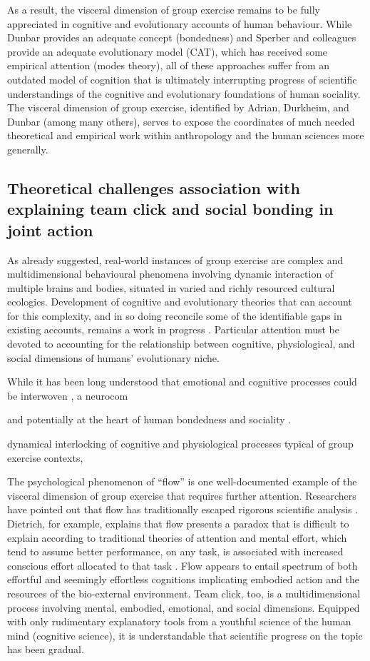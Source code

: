 \begin{CJK}{UTF8}{gbsn}
As a result, the visceral dimension of group exercise remains to be fully appreciated in cognitive and evolutionary accounts of human behaviour.  While Dunbar provides an adequate concept (bondedness) and Sperber and colleagues provide an adequate evolutionary model (CAT), which has received some empirical attention (modes theory), all of these approaches suffer from an outdated model of cognition that is ultimately interrupting progress of scientific understandings of the cognitive and evolutionary foundations of human sociality.  The visceral dimension of group exercise, identified by Adrian, Durkheim, and Dunbar (among many others), serves to expose the coordinates of much needed theoretical and empirical work within anthropology and the human sciences more generally.


\subsection{Theoretical challenges association with explaining team click and social bonding in joint action}

As already suggested, real-world instances of group exercise are complex and multidimensional behavioural phenomena involving dynamic interaction of multiple brains and bodies, situated in varied and richly resourced cultural ecologies.  Development of cognitive and evolutionary theories that can account for this complexity, and in so doing reconcile some of the identifiable gaps in existing accounts, remains a work in progress \citep{Fuentes2016}.  Particular attention must be devoted to accounting for the relationship between cognitive, physiological, and social dimensions of humans' evolutionary niche.


While it has been long understood that emotional and cognitive processes could be interwoven \citep[cf.][]{Damasio1994}, a neurocom

  and potentially at the heart of human bondedness and sociality \citep{Dunbar2010}.

dynamical interlocking of cognitive and physiological processes typical of group exercise contexts,




The psychological phenomenon of ``flow'' is one well-documented example of the visceral dimension of group exercise that requires further attention.  Researchers have pointed out that flow has traditionally escaped rigorous scientific analysis \citep{Dietrich2010a,Slingerland2014}. Dietrich, for example, explains that flow presents a paradox that is difficult to explain according to traditional theories of attention and mental effort, which tend to assume better performance, on any task, is associated with increased conscious effort allocated to that task \citep{Dietrich2004b}.  Flow appears to entail spectrum of both effortful and seemingly effortless cognitions implicating embodied action and the resources of the bio-external environment.  Team click, too, is a multidimensional process involving mental, embodied, emotional, and social dimensions.  Equipped with only rudimentary explanatory tools from a youthful science of the human mind (cognitive science), it is understandable that scientific progress on the topic has been gradual.


\end{CJK}
